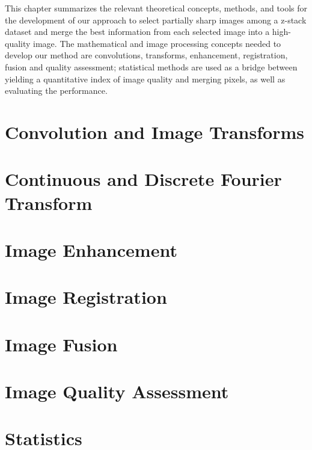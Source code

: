 
This chapter summarizes the relevant theoretical concepts, methods, and tools for the development of our approach to select partially sharp images among a z-stack dataset and merge the best information from each selected image into a high-quality image. The mathematical and image processing concepts needed to develop our method are convolutions, transforms, enhancement, registration, fusion and quality assessment; statistical methods are used as a bridge between yielding a quantitative index of image quality and merging pixels, as well as evaluating the performance.

\section{Convolution and Image Transforms}


\section{Continuous and Discrete Fourier Transform}


\section{Image Enhancement}


\section{Image Registration}


\section{Image Fusion}


\section{Image Quality Assessment}


\section{Statistics}
